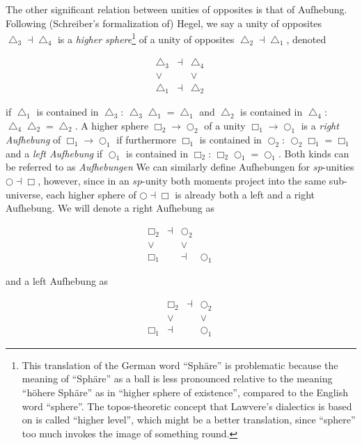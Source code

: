 \documentclass{article}
\begin{document}
The other significant relation between unities of opposites is that of Aufhebung. Following (Schreiber's
formalization of) Hegel, we say a unity of opposites $\bigtriangleup_3\dashv\bigtriangleup_4$ is a \emph{higher
sphere}\footnote{This translation of the German word ``Sphäre'' is problematic because the meaning of
``Sphäre'' as a ball is less pronounced relative to the meaning ``höhere Sphäre'' as in ``higher sphere
of existence'', compared to the English word ``sphere''. The topos-theoretic concept that Lawvere's dialectics
is based on is called ``higher level'', which might be a better translation, since ``sphere'' too much
invokes the image of something round.} of a unity of opposites $\bigtriangleup_2\dashv\bigtriangleup_1$,
denoted 

$$
  \begin{array}{ccc}
    \bigtriangleup_3 & \dashv & \bigtriangleup_4
    \\
    \vee & & \vee
    \\
    \bigtriangleup_1 & \dashv & \bigtriangleup_2
    \end{array}
  \ 
$$

if $\bigtriangleup_1$ is contained in $\bigtriangleup_3$: $\bigtriangleup_3\bigtriangleup_1=\bigtriangleup_1$
and $\bigtriangleup_2$ is contained in $\bigtriangleup_4$: $\bigtriangleup_4\bigtriangleup_2=\bigtriangleup_2$.
A higher sphere $\Box_2\rightarrow\bigcirc_2$ of a unity $\Box_1\rightarrow\bigcirc_1$ is a \emph{right
Aufhebung} of $\Box_1\rightarrow\bigcirc_1$ if furthermore $\Box_1$ is contained in $\bigcirc_2$: $\bigcirc_2\Box_1=\Box_1$
and a \emph{left Aufhebung} if $\bigcirc_1$ is contained in $\Box_2$: $\Box_2\bigcirc_1=\bigcirc_1$. Both
kinds can be referred to as \emph{Aufhebungen} We can similarly define Aufhebungen for $sp$-unities $\bigcirc\dashv\Box$,
however, since in an $sp$-unity both moments project into the same sub-universe, each higher sphere of
$\bigcirc\dashv\Box$ is already both a left and a right Aufhebung. We will denote a right Aufhebung as


$$
  \begin{array}{cccc}
    \Box_2 &\dashv& \bigcirc_2
    \\
    \vee & & \vee
    \\
    \Box_1 & & \dashv& \bigcirc_1
    \end{array}
  \ 
$$

and a left Aufhebung as

$$
  \begin{array}{cccc}
     & \Box_2 & \dashv & \bigcirc_2
    \\
     & \vee & & \vee
    \\
    \Box_1 & \dashv & & \bigcirc_1
    \end{array}
  \ 
$$
\end{document}
